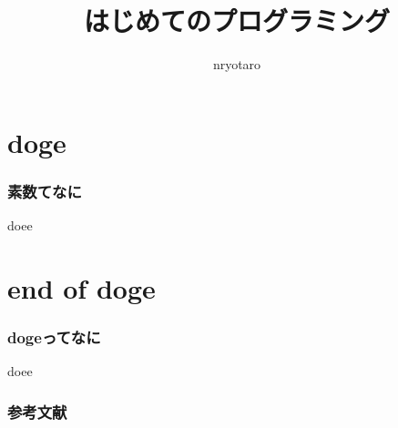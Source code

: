 \documentclass[unicode]{beamer}
\title{はじめてのプログラミング}
\author{nryotaro}
\institute{doge}
\begin{document}
\begin{frame}
\titlepage
\end{frame}
\section{doge}
\begin{frame}
\frametitle{素数てなに}
doee
\end{frame}
\section{end of doge}
\begin{frame}[t]
\frametitle{dogeってなに}
doee
\end{frame}
\begin{frame}[allowframebreaks]
  \frametitle{参考文献}
  
  \nocite{*} %


\end{frame}
\end{document}
